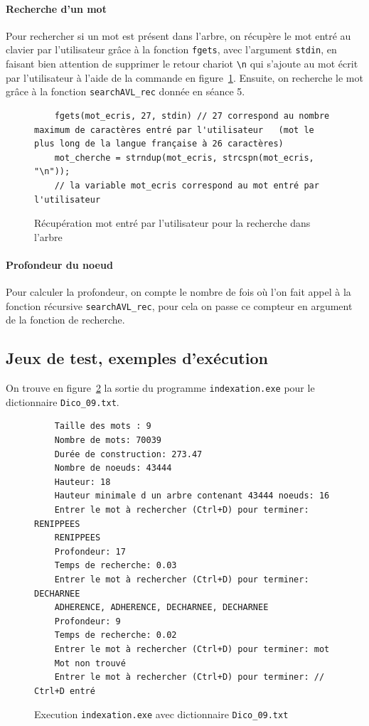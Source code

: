 \documentclass{article} %
\begin{document}
\paragraph{Recherche d'un mot}Pour rechercher si un mot est présent dans l'arbre, on récupère le mot entré au clavier par l'utilisateur grâce à la fonction \texttt{fgets}, avec l'argument \texttt{stdin}, en faisant bien attention de supprimer le retour chariot \texttt{\textbackslash n} qui s'ajoute au mot écrit par l'utilisateur à l'aide de la commande en figure~\ref{fig:recherche_mot}. Ensuite, on recherche le mot grâce à la fonction \texttt{searchAVL\_rec} donnée en séance 5. 

\begin{figure}[H]
  \begin{lstlisting}
    fgets(mot_ecris, 27, stdin) // 27 correspond au nombre maximum de caractères entré par l'utilisateur   (mot le plus long de la langue française à 26 caractères)
    mot_cherche = strndup(mot_ecris, strcspn(mot_ecris, "\n"));
    // la variable mot_ecris correspond au mot entré par l'utilisateur \end{lstlisting}
  
    \caption{Récupération mot entré par l'utilisateur pour la recherche dans l'arbre}
    \label{fig:recherche_mot}
\end{figure}


\paragraph{Profondeur du noeud} Pour calculer la profondeur, on compte le nombre de fois où l'on fait appel à la fonction récursive \texttt{searchAVL\_rec}, pour cela on passe ce compteur en argument de la fonction de recherche. 

\subsection{Jeux de test, exemples d'exécution}
On trouve en figure~\ref{fig:prog_2} la sortie du programme \texttt{indexation.exe} pour le dictionnaire \texttt{Dico\_09.txt}.

\begin{figure}[H]
  \begin{lstlisting}
    Taille des mots : 9
    Nombre de mots: 70039
    Durée de construction: 273.47 
    Nombre de noeuds: 43444
    Hauteur: 18
    Hauteur minimale d un arbre contenant 43444 noeuds: 16
    Entrer le mot à rechercher (Ctrl+D) pour terminer: RENIPPEES
    RENIPPEES
    Profondeur: 17
    Temps de recherche: 0.03
    Entrer le mot à rechercher (Ctrl+D) pour terminer: DECHARNEE
    ADHERENCE, ADHERENCE, DECHARNEE, DECHARNEE
    Profondeur: 9
    Temps de recherche: 0.02
    Entrer le mot à rechercher (Ctrl+D) pour terminer: mot
    Mot non trouvé
    Entrer le mot à rechercher (Ctrl+D) pour terminer: // Ctrl+D entré \end{lstlisting}
    \caption{Execution \texttt{indexation.exe} avec dictionnaire \texttt{Dico\_09.txt}}
    \label{fig:prog_2}
\end{figure}
\end{document}

